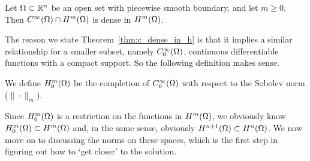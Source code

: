 \begin{thmx}{\quad}
   Let $\Omega \subset \mathbb{R}^n$ be an open set with piecewise smooth boundary, 
   and let $m \geq 0$. Then $C^\infty (\Omega) \cap H^m(\Omega)$ is dense in 
   $H^m(\Omega)$.\label{thm:c_dense_in_h}
\end{thmx}
The reason we state Theorem~\ref{thm:c_dense_in_h} is that it implies a 
similar relationship for a smaller subset, namely $C^\infty_0(\Omega)$, 
continuous differentiable functions with a compact support. So the following 
definition makes sense.
\begin{defn}{\quad}
  We define $H_0^m(\Omega)$ be the completion of $C^\infty_0(\Omega)$ with respect 
  to the Sobolev norm
 ($\| \cdot \|_m$).
\end{defn} 
Since $H_0^m(\Omega)$ is a restriction on the functions in $H^m(\Omega)$, 
we obviously know $H_0^m(\Omega) \subset H^m(\Omega)$ and, in the same 
sense, obviously $H^{n+1}(\Omega) \subset H^n(\Omega)$.
We now move on to discussing the norms on these spaces, 
which is the first step in figuring out how to `get closer' to 
the solution.